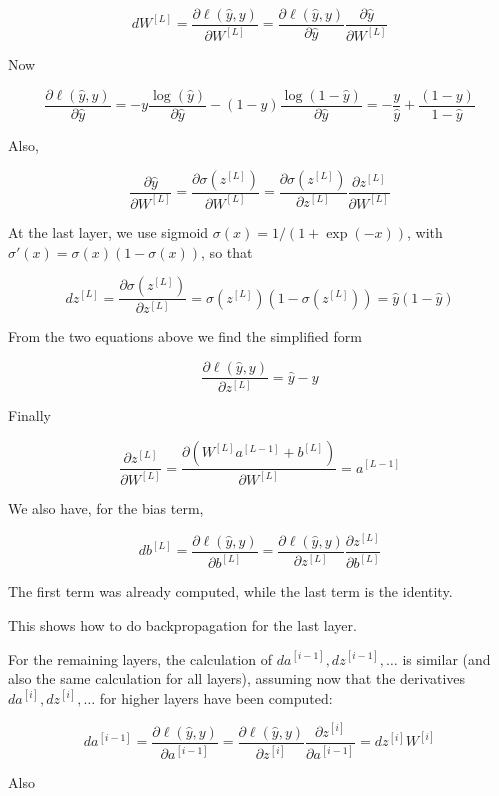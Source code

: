 \documentclass[english]{article}
\begin{document}
$$d W^{[L]} = \frac{\partial \ell(\hat y, y)}{\partial  W^{[L]}} = \frac{\partial \ell(\hat y, y)}{\partial  \hat y} \frac{\partial \hat y}{\partial  W^{[L]}}$$

Now 

$$\frac{\partial \ell(\hat y, y)}{\partial  \hat y} 
= - y\frac{ \log(\hat y)}{\partial  \hat y} - (1-y) \frac{ \log(1-\hat y)}{\partial  \hat y} 
= - \frac{y}{\hat y} + \frac{(1-y)}{1-  \hat y}$$

Also,

$$\frac{\partial \hat y}{\partial  W^{[L]}} 
=  \frac{\partial \sigma(z^{[L]})}{\partial  W^{[L]}} 
= \frac{\partial \sigma(z^{[L]})}{\partial  z^{[L]}}  \frac{\partial z^{[L]}}{\partial  W^{[L]}} $$

At the last layer, we use sigmoid $\sigma(x) = 1/(1+\exp(-x))$, with $\sigma'(x) = \sigma(x) (1-\sigma(x))$, so that 

$$dz^{[L]}= \frac{\partial \sigma(z^{[L]})}{\partial  z^{[L]}} =  \sigma(z^{[L]})(1-\sigma(z^{[L]})) = \hat y (1-\hat y)$$

From the two equations above we find the simplified form

$$\frac{\partial \ell(\hat y, y)}{\partial  z^{[L]}} = \hat y - y$$


Finally

$$ \frac{\partial z^{[L]}}{\partial  W^{[L]}} = \frac{\partial (W^{[L]} a^{[L-1]}+b^{[L]})}{\partial  W^{[L]}} = a^{[L-1]}$$


We also have, for the bias term, 

$$d b^{[L]} 
= \frac{\partial \ell(\hat y, y)}{\partial  b^{[L]}} 
= \frac{\partial \ell(\hat y, y)}{\partial  z^{[L]}}  \frac{\partial z^{[L]}}{\partial  b^{[L]}} $$

The first term was already computed, while the last term is the identity. 


This shows how to do backpropagation for the last layer. 


\item 
For the remaining layers, the calculation of $da^{[i-1]}, dz^{[i-1]}, \ldots $ is similar (and also the same calculation for all layers), assuming now that the derivatives $da^{[i]}, dz^{[i]}, \ldots $  for higher layers have been computed: 

$$d a^{[i-1]} 
= \frac{\partial \ell(\hat y, y)}{\partial  a^{[i-1]}} 
= \frac{\partial \ell(\hat y, y)}{\partial  z^{[i]}} \frac{\partial  z^{[i]}} {\partial  a^{[i-1]}}
= dz^{[i]}W^{[i]}$$

Also
\end{document}
